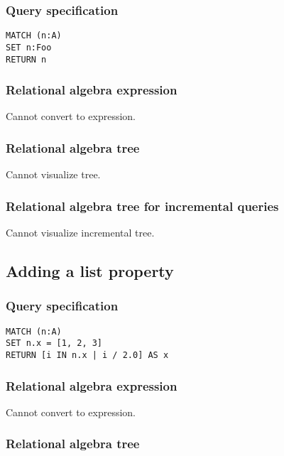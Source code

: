 \subsubsection*{Query specification}

\begin{lstlisting}
MATCH (n:A)
SET n:Foo
RETURN n
\end{lstlisting}

\subsubsection*{Relational algebra expression}

Cannot convert to expression.

\subsubsection*{Relational algebra tree}

Cannot visualize tree.

\subsubsection*{Relational algebra tree for incremental queries}

Cannot visualize incremental tree.

\subsection{Adding a list property}

\subsubsection*{Query specification}

\begin{lstlisting}
MATCH (n:A)
SET n.x = [1, 2, 3]
RETURN [i IN n.x | i / 2.0] AS x
\end{lstlisting}

\subsubsection*{Relational algebra expression}

Cannot convert to expression.

\subsubsection*{Relational algebra tree}


